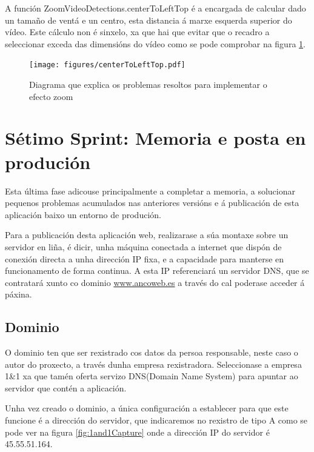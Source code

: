         A función ZoomVideoDetections.centerToLeftTop é a encargada de calcular dado un tamaño de ventá 
        e un centro, esta distancia á marxe esquerda superior do vídeo. Este cálculo non é sinxelo, xa que 
        hai que evitar que o recadro a seleccionar exceda das dimensións do vídeo como se pode
        comprobar na figura \ref{fig:centerToLeftTop}.
        
        \begin{figure}[htp]
        \begin{center}
            \texttt{[image: figures/centerToLeftTop.pdf]}
            \caption{Diagrama que explica os problemas resoltos para implementar o efecto zoom}
        \label{fig:centerToLeftTop}
        \end{center}
        \end{figure}

\section{Sétimo Sprint: Memoria e posta en produción}
    Esta última fase adicouse principalmente a completar a memoria, a solucionar pequenos problemas
    acumulados nas anteriores versións e á publicación de esta aplicación baixo un entorno de 
    produción.
    
    Para a publicación desta aplicación web, realizarase a súa montaxe sobre un servidor en liña,
    é dicir, unha máquina conectada a internet que dispón de conexión directa a unha dirección IP
    fixa, e a capacidade para manterse en funcionamento de forma continua. A esta IP referenciará un
    servidor DNS, que se contratará xunto co dominio \url{www.ancoweb.es} a través do cal poderase
    acceder á páxina.

    \subsection{Dominio}
        O dominio ten que ser rexistrado cos datos da persoa responsable, neste caso o autor do 
        proxecto, a través dunha empresa rexistradora. Seleccionase a empresa 1\&1
        \cite{1and1-website} xa que tamén oferta servizo DNS(Domain Name System) para apuntar ao 
        servidor que contén a aplicación.
        
        Unha vez creado o dominio, a única configuración a establecer para que este funcione 
        é a dirección do servidor, que indicaremos no rexistro de tipo A como se pode
        ver na figura \ref{fig:1and1Capture} onde a dirección IP do servidor é 45.55.51.164.

